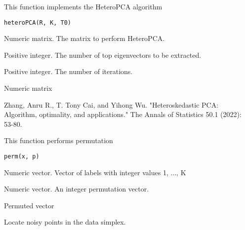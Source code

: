 \documentclass[a4paper]{book}
\begin{document}
%
\begin{Description}
This function implements the HeteroPCA algorithm
\end{Description}
%
\begin{Usage}
\begin{verbatim}
heteroPCA(R, K, T0)
\end{verbatim}
\end{Usage}
%
\begin{Arguments}
\begin{ldescription}
\item[\code{R}] Numeric matrix. The matrix to perform HeteroPCA.

\item[\code{K}] Positive integer. The number of top eigenvectors to be extracted.

\item[\code{T0}] Positive integer. The number of iterations.
\end{ldescription}
\end{Arguments}
%
\begin{Value}
Numeric matrix 
\end{Value}
%
\begin{References}
Zhang, Anru R., T. Tony Cai, and Yihong Wu. "Heteroskedastic PCA: Algorithm, optimality, and applications." The Annals of Statistics 50.1 (2022): 53-80.
\end{References}
%
\begin{Description}
This function performs permutation
\end{Description}
%
\begin{Usage}
\begin{verbatim}
perm(x, p)
\end{verbatim}
\end{Usage}
%
\begin{Arguments}
\begin{ldescription}
\item[\code{x}] Numeric vector. Vector of labels with integer values 1, ..., K

\item[\code{p}] Numeric vector. An integer permutation vector.
\end{ldescription}
\end{Arguments}
%
\begin{Value}
Permuted vector 
\end{Value}
%
\begin{Description}
Locate noisy points in the data simplex.
\end{Description}
\end{document}
